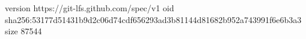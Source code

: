 version https://git-lfs.github.com/spec/v1
oid sha256:53177d51431b9d2c06d74cdf656293ad3b81144d81682b952a743991f6e6b3a3
size 87544
